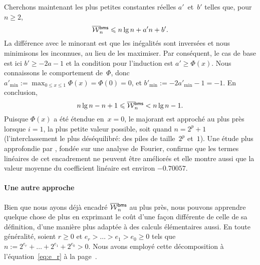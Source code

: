 Cherchons maintenant les plus petites constantes réelles
\(a'\)~et~\(b'\) telles que, pour \(n \geqslant 2\),
\begin{equation*}
\OW{\fun{bms}}{n} \leqslant n\lg n + a'n + b'.
\end{equation*}
La différence avec le minorant est que les inégalités sont inversées
et nous minimisons les inconnues, au lieu de les maximiser. Par
conséquent, le cas de base est ici \(b' \geqslant -2a - 1\) et la
condition pour l'induction est \(a' \geqslant \Phi(x)\). Nous
connaissons le comportement de~\(\Phi\), donc \(a'_{\min} := \max_{0
  \leqslant x \leqslant 1}\Phi(x) = \Phi(0) = 0\), et \(b'_{\min} :=
-2a'_{\min} - 1 = -1\). En conclusion,
\begin{equation}
n\lg n - n + 1 \leqslant \OW{\fun{bms}}{n} < n\lg n - 1.
\label{ineq:OWbms}
\end{equation}
Puisque \(\Phi(x)\) a été étendue en~\(x=0\), le majorant est approché
au plus près lorsque \(i=1\), la plus petite valeur possible, soit
quand \(n=2^p+1\) (l'interclassement le plus déséquilibré: des piles
de taille~\(2^p\) et~\(1\)). Une étude plus approfondie par
\cite{PannyProdinger_1995}, fondée sur une analyse de Fourier,
confirme que les termes linéaires de cet encadrement ne peuvent être
améliorés et elle montre aussi que la valeur moyenne du coefficient
linéaire est environ \(-0.70057\).


\paragraph{Une autre approche}

Bien que nous ayons déjà encadré \(\OW{\fun{bms}}{n}\) au plus près,
nous pouvons apprendre quelque chose de plus en exprimant le coût
d'une façon différente de celle de sa définition, d'une manière plus
adaptée à des calculs élémentaires aussi. En toute généralité, soient
\(r \geqslant 0\) et \(e_r > \dots > e_1 > e_0 \geqslant 0\) tels que
\(n := 2^{e_r} + \dots + 2^{e_1} + 2^{e_0} > 0\). Nous avons employé
cette décomposition à l'équation~\eqref{eq:e_r} à la
page~\pageref{eq:e_r}.

